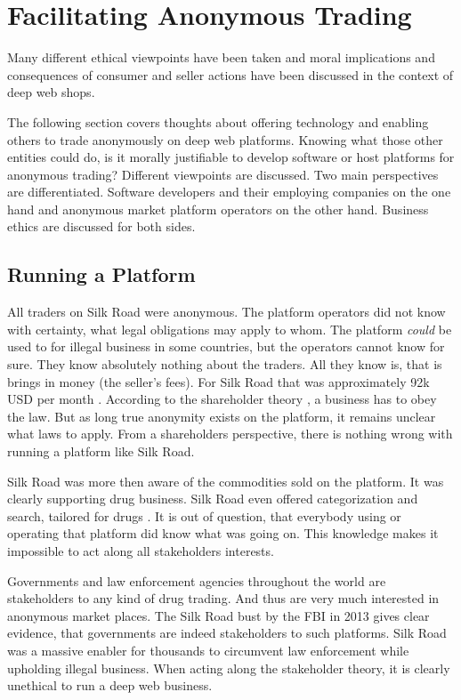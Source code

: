 \section{Facilitating Anonymous Trading}
\label{tech}

Many different ethical viewpoints have been taken and moral implications and consequences of consumer and seller actions have been discussed in the context of deep web shops.

The following section covers thoughts about offering technology and enabling others to trade anonymously on deep web platforms. Knowing what those other entities could do, is it morally justifiable to develop software or host platforms for anonymous trading? Different viewpoints are discussed. Two main perspectives are differentiated. Software developers and their employing companies on the one hand and anonymous market platform operators on the other hand. Business ethics are discussed for both sides.

\subsection{Running a Platform}

All traders on Silk Road were anonymous. The platform operators did not know with certainty, what legal obligations may apply to whom. The platform \emph{could} be used to for illegal business in some countries, but the operators cannot know for sure. They know absolutely nothing about the traders. All they know is, that is brings in money (the seller's fees). For Silk Road that was approximately 92k USD per month \cite{silkroad2013}. According to the shareholder theory \cite{shareholder}, a business has to obey the law. But as long true anonymity exists on the platform, it remains unclear what laws to apply. From a shareholders perspective, there is nothing wrong with running a platform like Silk Road.

Silk Road was more then aware of the commodities sold on the platform. It was clearly supporting drug business. Silk Road even offered categorization and search, tailored for drugs \cite{silkroad2013}. It is out of question, that everybody using or operating that platform did know what was going on. This knowledge makes it impossible to act along all stakeholders interests.

Governments and law enforcement agencies throughout the world are stakeholders to any kind of drug trading. And thus are very much interested in anonymous market places. The Silk Road bust by the FBI in 2013 gives clear evidence, that governments are indeed stakeholders to such platforms. Silk Road was a massive enabler for thousands to circumvent law enforcement while upholding illegal business. When acting along the stakeholder theory, it is clearly unethical to run a deep web business.

